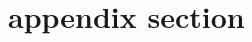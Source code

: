 \documentclass[manuscript]{aastex61}
\begin{document}
\appendix
\section{appendix section}
\end{document}
